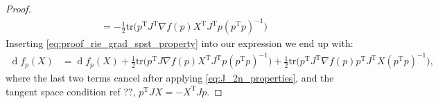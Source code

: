\begin{proof}
\begin{align}
        &=-\tfrac{1}{2} \mathrm{tr}\big(p ^{\mathrm{T}}J ^{\mathrm{T}} \nabla f(p)X ^{\mathrm{T}}J ^{\mathrm{T}}p(p ^{\mathrm{T}}p)^{-1}\big) \label{eq:proof_rie_grad_spst_property}
    \end{align}
    Inserting \ref{eq:proof_rie_grad_spst_property} into our expression we end up with:
    \begin{equation*}
        \begin{split}
            \operatorname{d}f_{p}(X)&= \operatorname{d}f_{p}(X)+\tfrac{1}{2} \mathrm{tr}\big(p ^{\mathrm{T}}J \nabla f(p)X ^{\mathrm{T}}J ^{\mathrm{T}}p(p ^{\mathrm{T}}p)^{-1}\big)+\tfrac{1}{2}\mathrm{tr}\big(p ^{\mathrm{T}}J ^{\mathrm{T}}\nabla f(p) p ^{\mathrm{T}}J ^{\mathrm{T}}X(p ^{\mathrm{T}}p)^{-1}\big),
        \end{split}
    \end{equation*}
    where the last two terms cancel after applying \eqref{eq:J_2n_properties}, and the tangent space condition ref ??, $p ^{\mathrm{T}}JX=-X ^{\mathrm{T}}Jp$.
\end{proof}